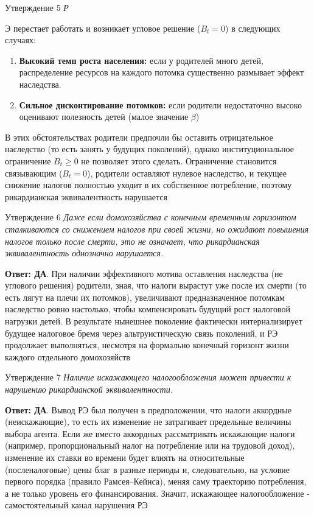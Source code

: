 \documentclass[10pt,a4paper]{article}
\newcommand{\qda}{\textbf{\color{yesgreen}Ответ: ДА}}
\newenvironment{answer}[2]{%
  \begin{qbox}{Утверждение #1}
  \textit{#2}\par\smallskip
}{%
  \end{qbox}\vspace{2pt}
}
\begin{document}
\begin{answer}{5}
РЭ перестает работать и возникает угловое решение ($B_t = 0$) в следующих случаях:
\begin{enumerate}
    \item \textbf{Высокий темп роста населения:} если у родителей много детей, распределение ресурсов на каждого потомка существенно размывает эффект наследства.
    \item \textbf{Сильное дисконтирование потомков:} если родители недостаточно высоко оценивают полезность детей (малое значение $\beta$)
\end{enumerate}

В этих обстоятельствах родители предпочли бы оставить отрицательное наследство (то есть занять у будущих поколений), однако институциональное ограничение $B_t \ge 0$ не позволяет этого сделать. Ограничение становится связывающим ($B_t = 0$), родители оставляют нулевое наследство, и текущее снижение налогов полностью уходит в их собственное потребление, поэтому рикардианская эквивалентность нарушается
\end{answer}

\begin{answer}{6}{Даже если домохозяйства с конечным временным горизонтом сталкиваются со снижением налогов при своей жизни, но ожидают повышения налогов только после смерти, это не означает, что рикардианская эквивалентность однозначно нарушается.}
\qda. При наличии эффективного мотива оставления наследства (не углового решения) родители, зная, что налоги вырастут уже после их смерти (то есть лягут на плечи их потомков), увеличивают предназначенное потомкам наследство ровно настолько, чтобы компенсировать будущий рост налоговой нагрузки детей. В результате нынешнее поколение фактически интернализирует будущее налоговое бремя через альтруистическую связь поколений, и РЭ продолжает выполняться, несмотря на формально конечный горизонт жизни каждого отдельного домохозяйств
\end{answer}

\begin{answer}{7}{Наличие искажающего налогообложения может привести к нарушению рикардианской эквивалентности.}
\qda. Вывод РЭ был получен в предположении, что налоги аккордные (неискажающие), то есть их изменение не затрагивает предельные величины выбора агента. Если же вместо аккордных рассматривать искажающие налоги (например, пропорциональный налог на потребление или на трудовой доход), изменение их ставки во времени будет влиять на относительные (посленалоговые) цены благ в разные периоды и, следовательно, на условие первого порядка (правило Рамсея–Кейнса), меняя саму траекторию потребления, а не только уровень его финансирования. Значит, искажающее налогообложение - самостоятельный канал нарушения РЭ
\end{answer}
\end{document}
